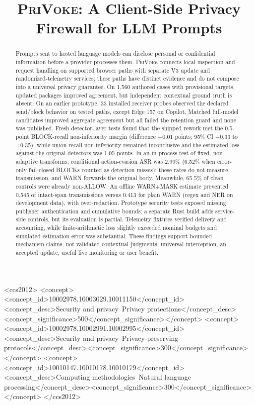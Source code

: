 \documentclass[sigconf]{acmart}
\theoremstyle{acmdefinition}\newtheorem{property}{Property}
\newcommand{\privoke}{\textsc{PriVoke}\xspace}
\begin{document}
\title{\privoke: A Client-Side Privacy Firewall for LLM Prompts}

\author{}

\begin{abstract}
Prompts sent to hosted language models can disclose personal or confidential information before a provider processes them. \privoke connects local inspection and request handling on supported browser paths with separate V3 update and randomized-telemetry services; these paths have distinct evidence and do not compose into a universal privacy guarantee. On 1,560 authored cases with provisional targets, updated packages improved agreement, but independent contextual ground truth is absent. On an earlier prototype, 33 installed receiver probes observed the declared send/block behavior on tested paths, except Edge 157 on Copilot. Matched full-model candidates improved aggregate agreement but all failed the retention guard and none was published. Fresh detector-layer tests found that the shipped rework met the 0.5-point BLOCK-recall non-inferiority margin (difference $+0.01$ points; 95\% CI $-0.33$ to $+0.35$), while union-recall non-inferiority remained inconclusive and the estimated loss against the original detectors was 1.05 points. In an in-process test of fixed, non-adaptive transforms, conditional action-evasion ASR was 2.99\% (6.52\% when error-only fail-closed BLOCKs counted as detection misses); these rates do not measure transmission, and WARN forwards the original body. Meanwhile, 65.5\% of clean controls were already non-ALLOW. An offline WARN+MASK estimate prevented 0.545 of intact-span transmissions versus 0.413 for plain WARN (regex and NER on development data), with over-redaction. Prototype security tests exposed missing publisher authentication and cumulative bounds; a separate Rust build adds service-side controls, but its evaluation is partial. Telemetry fixtures verified delivery and accounting, while finite-arithmetic loss slightly exceeded nominal budgets and simulated estimation error was substantial. These findings support bounded mechanism claims, not validated contextual judgments, universal interception, an accepted update, useful live monitoring or user benefit.
\end{abstract}
\begin{CCSXML}
<ccs2012>
<concept><concept_id>10002978.10003029.10011150</concept_id><concept_desc>Security and privacy~Privacy protections</concept_desc><concept_significance>500</concept_significance></concept>
<concept><concept_id>10002978.10002991.10002995</concept_id><concept_desc>Security and privacy~Privacy-preserving protocols</concept_desc><concept_significance>300</concept_significance></concept>
<concept><concept_id>10010147.10010178.10010179</concept_id><concept_desc>Computing methodologies~Natural language processing</concept_desc><concept_significance>300</concept_significance></concept>
</ccs2012>
\end{CCSXML}
\end{document}
